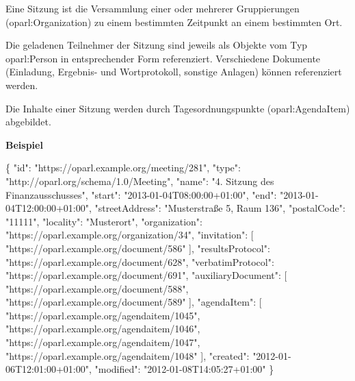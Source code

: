 \documentclass[,a4paper]{article}
\newenvironment{Shaded}{}{}
\newcommand{\DataTypeTok}[1]{\textcolor[rgb]{0.56,0.13,0.00}{{#1}}}
\newcommand{\StringTok}[1]{\textcolor[rgb]{0.25,0.44,0.63}{{#1}}}
\newcommand{\OtherTok}[1]{\textcolor[rgb]{0.00,0.44,0.13}{{#1}}}
\newcommand{\FunctionTok}[1]{\textcolor[rgb]{0.02,0.16,0.49}{{#1}}}
\begin{document}
Eine Sitzung ist die Versammlung einer oder mehrerer Gruppierungen
(oparl:Organization) zu einem bestimmten Zeitpunkt an einem bestimmten
Ort.

Die geladenen Teilnehmer der Sitzung sind jeweils als Objekte vom Typ
oparl:Person in entsprechender Form referenziert. Verschiedene Dokumente
(Einladung, Ergebnis- und Wortprotokoll, sonstige Anlagen) können
referenziert werden.

Die Inhalte einer Sitzung werden durch Tagesordnungspunkte
(oparl:AgendaItem) abgebildet.

\textbf{Beispiel}

\begin{Shaded}
\begin{Highlighting}[]
\FunctionTok{\{}
    \DataTypeTok{"id"}\FunctionTok{:} \StringTok{"https://oparl.example.org/meeting/281"}\FunctionTok{,}
    \DataTypeTok{"type"}\FunctionTok{:} \StringTok{"http://oparl.org/schema/1.0/Meeting"}\FunctionTok{,}
    \DataTypeTok{"name"}\FunctionTok{:} \StringTok{"4. Sitzung des Finanzausschusses"}\FunctionTok{,}
    \DataTypeTok{"start"}\FunctionTok{:} \StringTok{"2013-01-04T08:00:00+01:00"}\FunctionTok{,}
    \DataTypeTok{"end"}\FunctionTok{:} \StringTok{"2013-01-04T12:00:00+01:00"}\FunctionTok{,}
    \DataTypeTok{"streetAddress"}\FunctionTok{:} \StringTok{"Musterstraße 5, Raum 136"}\FunctionTok{,}
    \DataTypeTok{"postalCode"}\FunctionTok{:} \StringTok{"11111"}\FunctionTok{,}
    \DataTypeTok{"locality"}\FunctionTok{:} \StringTok{"Musterort"}\FunctionTok{,}
    \DataTypeTok{"organization"}\FunctionTok{:} \StringTok{"https://oparl.example.org/organization/34"}\FunctionTok{,}
    \DataTypeTok{"invitation"}\FunctionTok{:} \OtherTok{[}
        \StringTok{"https://oparl.example.org/document/586"}
    \OtherTok{]}\FunctionTok{,}
    \DataTypeTok{"resultsProtocol"}\FunctionTok{:} \StringTok{"https://oparl.example.org/document/628"}\FunctionTok{,}
    \DataTypeTok{"verbatimProtocol"}\FunctionTok{:} \StringTok{"https://oparl.example.org/document/691"}\FunctionTok{,}
    \DataTypeTok{"auxiliaryDocument"}\FunctionTok{:} \OtherTok{[}
        \StringTok{"https://oparl.example.org/document/588"}\OtherTok{,}
        \StringTok{"https://oparl.example.org/document/589"}
    \OtherTok{]}\FunctionTok{,}
    \DataTypeTok{"agendaItem"}\FunctionTok{:} \OtherTok{[}
        \StringTok{"https://oparl.example.org/agendaitem/1045"}\OtherTok{,}
        \StringTok{"https://oparl.example.org/agendaitem/1046"}\OtherTok{,}
        \StringTok{"https://oparl.example.org/agendaitem/1047"}\OtherTok{,}
        \StringTok{"https://oparl.example.org/agendaitem/1048"}
    \OtherTok{]}\FunctionTok{,}
    \DataTypeTok{"created"}\FunctionTok{:} \StringTok{"2012-01-06T12:01:00+01:00"}\FunctionTok{,}
    \DataTypeTok{"modified"}\FunctionTok{:} \StringTok{"2012-01-08T14:05:27+01:00"}
\FunctionTok{\}}
\end{Highlighting}
\end{Shaded}
\end{document}
